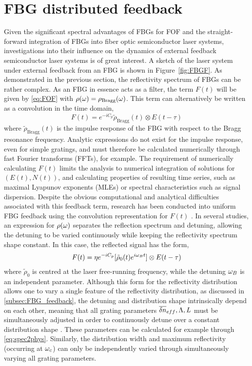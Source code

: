 \section*{FBG distributed feedback}
\label{sec:FBG_feedback}
%
Given the significant spectral advantages of FBGs for FOF and the straight-forward integration of FBGs into fiber optic semiconductor laser systems, investigations into their influence on the dynamics of external feedback semiconductor laser systems is of great interest. A sketch of the laser system under external feedback from an FBG is shown in Figure~\ref{fig:FBGF}. As demonstrated in the previous section, the reflectivity spectrum of FBGs can be rather complex. As an FBG in essence acts as a filter, the term $F(t)$ will be given by \eqref{eq:FOF} with $\rho(\omega) = \rho_\text{Bragg}(\omega)$. This term can alternatively be written as a convolution in the time domain,
%
\begin{equation}
    \label{eq:convolution}
     F(t) = e^{-i C_p} \tilde{\rho}_\text{Bragg}(t) \otimes E(t-\tau)
\end{equation}
%
where $\tilde{\rho}_\text{Bragg}(t)$ is the impulse response of the FBG with respect to the Bragg resonance frequency. Analytic expressions do not exist for the impulse response, even for simple gratings, and must therefore be calculated numerically through fast Fourier transforms (FFTs), for example. The requirement of numerically calculating $F(t)$ limits the analysis to numerical integration of solutions for $(E(t),N(t))$, and calculating properties of resulting time series, such as maximal Lyapunov exponents (MLEs) or spectral characteristics such as signal dispersion. Despite the obvious computational and analytical difficulties associated with this feedback term, research has been conducted into uniform FBG feedback using the convolution representation for $F(t)$ \cite{li2012distributed, li2015chaotic, li2020stable, jiang2021characterizing, skenderas2021feedback, skenderas2024impact}. In several studies, an expression for $\rho(\omega)$ separates the reflection spectrum and detuning, allowing the detuning to be varied continuously while keeping the reflectivity spectrum shape constant. In this case, the reflected signal has the form,
%
\begin{equation*}
    F(t) = \eta e^{-i C_p} [\tilde{\rho}_0(t) e^{i \omega_B t}] \otimes E(t-\tau)
\end{equation*}
%
where $\tilde{\rho}_0$ is centred at the laser free-running frequency, while the detuning $\omega_B$ is an independent parameter. Although this form for the reflectivity distribution allows one to vary a single feature of the reflectivity distribution, as discussed in \ref{subsec:FBG_feedback}, the detuning and distribution shape intrinsically depend on each other, meaning that all grating parameters $\overline{\delta n}_{eff}, \Lambda, L$ must be simultaneously adjusted in order to continuously detune over a constant distribution shape \cite{skenderas2024impact}. These parameters can be calculated for example through \eqref{eq:spec2phys}. Similarly, the distribution width and maximum reflectivity (occurring at $\omega_c$) can only be independently varied through simultaneously varying all grating parameters.
